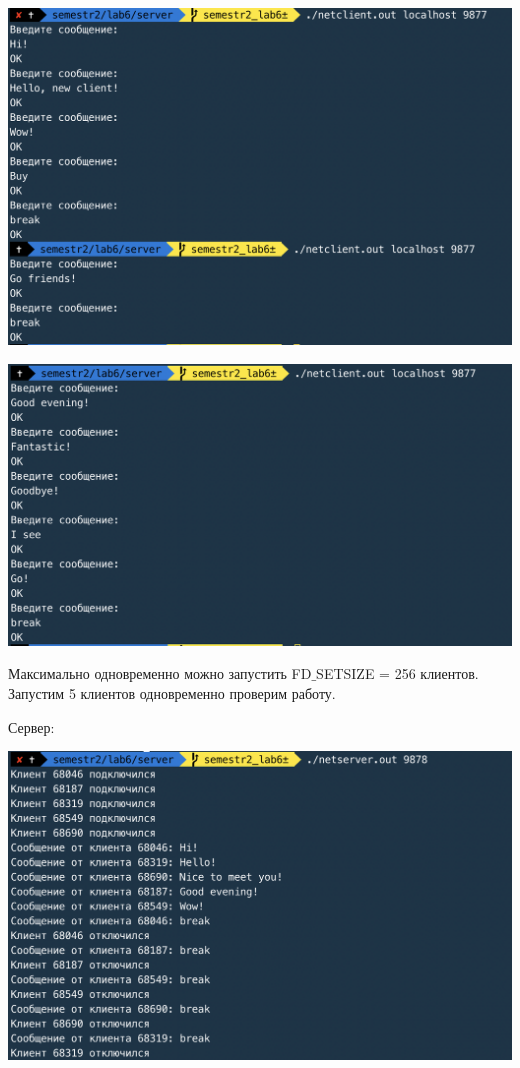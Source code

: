 \documentclass[a4paper,14pt]{extreport} %
\begin{document}
\includegraphics[scale=0.8]{client22}

\includegraphics[scale=0.8]{client23}

Максимально одновременно можно запустить FD$\_$SETSIZE = 256 клиентов. Запустим 5 клиентов одновременно проверим работу. 

Сервер:

\includegraphics[scale=0.8]{server22}
\end{document}
